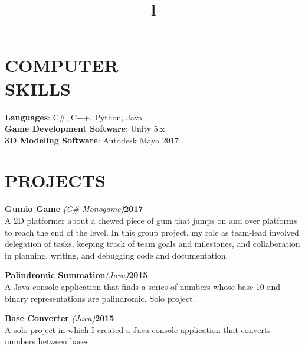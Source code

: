 \documentclass[line,margin]{res}
\begin{document}
\begin{resume}
\section{COMPUTER\\SKILLS}
\textbf{Languages}: C\#, C++, Python, Java\\
\textbf{Game Development Software}: Unity 5.x\\
\textbf{3D Modeling Software}: Autodesk Maya 2017
\section{PROJECTS}
\par
    \href{https://github.com/MaeveMonster/GumioGame}{\textbf{Gumio Game}}
    {\sl (C\# Monogame)}\hfill \textbf{2017}\\ 
    A 2D platformer about a chewed piece of gum that jumps on and over platforms to 
	reach the end of the level. In this group project, my role as team-lead involved delegation of tasks, keeping track of team goals and milestones, and collaboration in planning, writing, and debugging code and documentation.
\par
    \href{https://github.com/MaeveMonster/PalindromicSummation}
    {\textbf{Palindromic Summation}}{\sl (Java)}\hfill \textbf{2015}\\
    A Java console application that finds a series of numbers whose base 10 and binary representations are palindromic. Solo project.
\par
    \href{https://github.com/MaeveMonster/BaseConverter}{\textbf{Base Converter}}
    {\sl (Java)}\hfill \textbf{2015}\\ 
    A solo project in which I created a Java console application that converts numbers between bases.

\begin{format}
\title{l}\\
\\
\body\\
\end{format}

\end{resume}
\end{document}

